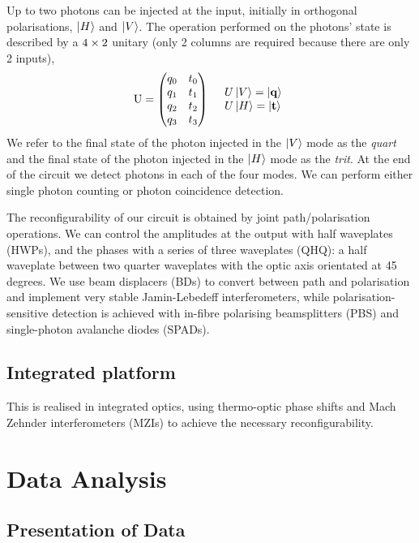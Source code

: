 Up to two photons can be injected at the input, initially in orthogonal
polarisations, \(\left|H\right\rangle\) and \(\left|V\right\rangle\). The operation performed on the
photons' state is described by a \(4 \times 2\) unitary (only 2 columns are
required because there are only 2 inputs),
\begin{align}
  \mathrm{U} = \begin{pmatrix}
    q_{0} & t_{0} \\
    q_{1} & t_{1} \\
    q_{2} & t_{2} \\
    q_{3} & t_{3}
  \end{pmatrix} && \begin{array}{l}
    U \left|V\right\rangle = \left|\mathbf{q}\right\rangle \\
    U \left|H\right\rangle = \left|\mathbf{t}\right\rangle
  \end{array}
\end{align}
We refer to the final state of the photon injected in the \(\left|V\right\rangle\) mode as
the \emph{quart} and the final state of the photon injected in the \(\left|H\right\rangle\)
mode as the \emph{trit}. At the end of the circuit we detect photons in each of
the four modes. We can perform either single photon counting or photon
coincidence detection.

The reconfigurability of our circuit is obtained by joint path/polarisation
operations. We can control the amplitudes at the output with half waveplates
(HWPs), and the phases with a series of three waveplates (QHQ): a half waveplate
between two quarter waveplates with the optic axis orientated at 45 degrees.
We use beam displacers (BDs) to convert between path and polarisation and
implement very stable Jamin-Lebedeff interferometers, while
polarisation-sensitive detection is achieved with in-fibre polarising
beamsplitters (PBS) and single-photon avalanche diodes (SPADs).

\subsection{Integrated platform}
This is realised in integrated optics, using thermo-optic phase shifts and Mach
Zehnder interferometers (MZIs) to achieve the necessary reconfigurability.

\section{Data Analysis}
\subsection{Presentation of Data}

